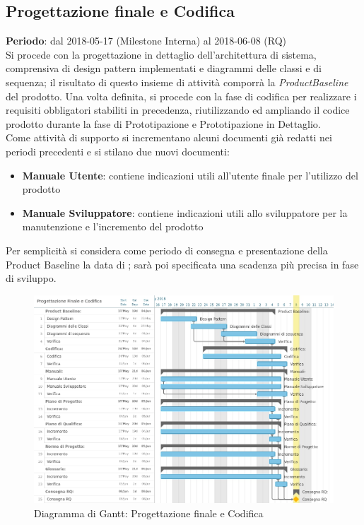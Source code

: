 \subsection{Progettazione finale e Codifica}
\textbf{Periodo}: dal 2018-05-17 (Milestone Interna) al 2018-06-08 (RQ)\\

Si procede con la progettazione in dettaglio dell'architettura di sistema, comprensiva di design pattern implementati e diagrammi delle classi e di sequenza; il risultato di questo insieme di attività comporrà la \emph{ProductBaseline} del prodotto. Una volta definita, si procede con la fase di codifica per realizzare i requisiti obbligatori stabiliti in precedenza, riutilizzando ed ampliando il codice prodotto durante la fase di Prototipazione e Prototipazione in Dettaglio. \\
Come attività di supporto si incrementano alcuni documenti già redatti nei periodi precedenti e si stilano due nuovi documenti:
\begin{itemize}
	\item \textbf{Manuale Utente}: contiene indicazioni utili all'utente finale per l'utilizzo del prodotto
	\item \textbf{Manuale Sviluppatore}: contiene indicazioni utili allo sviluppatore per la manutenzione e l'incremento del prodotto
\end{itemize}
Per semplicità si considera come periodo di consegna e presentazione della Product Baseline la data di \RQ{}; sarà poi specificata una scadenza più precisa in fase di sviluppo.

\begin{figure}[h!]
	\centerline{\includegraphics[scale=0.5]{img/DiagrammiGantt/ProgettazioneFinaleCodifica.jpg}}
	\caption{Diagramma di Gantt: Progettazione finale e Codifica}
	\label{fig:gantt_prog_fin_cod}
\end{figure}
\clearpage

